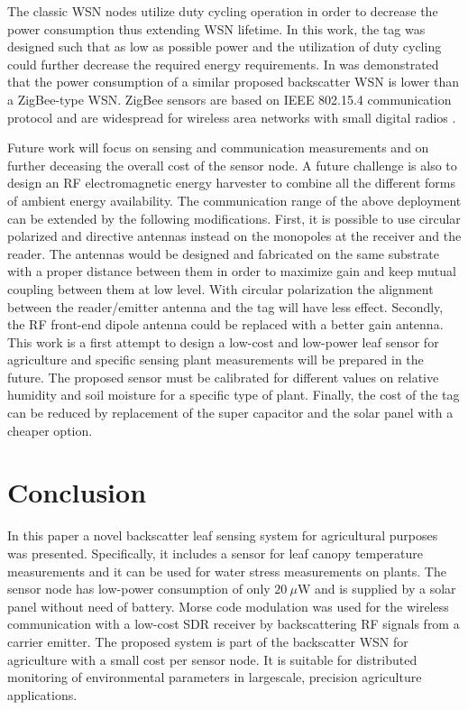 \documentclass[journal]{IEEEtran}
\begin{document}
%
The classic  WSN nodes utilize duty cycling operation in
order to decrease the power consumption thus extending WSN lifetime.
%
In this work, the  tag was designed such that as low as possible power and the utilization of duty cycling could further decrease the required energy requirements.
%
In \cite{kampianakis2014wireless} was demonstrated that the power consumption of a similar proposed backscatter WSN is lower than a ZigBee-type WSN. 
%
ZigBee sensors are based on IEEE 802.15.4 communication protocol and are widespread for  wireless area networks with small digital radios \cite{baronti2007wireless}.


Future work will focus on sensing and communication measurements and  
on  further deceasing the overall cost of the sensor node.
%
A future challenge is  also to  design an RF  electromagnetic energy  harvester  to combine all the different forms of ambient energy availability.
%
The communication range of  the above deployment can be extended  by the
following modifications.
%
First, it is possible to use circular polarized and directive antennas instead on the monopoles at the  receiver and the reader. 
%
%
The antennas  would be  designed and fabricated on the same substrate with    
a proper distance  between them in order to maximize gain  and keep mutual coupling between them at low level. 
%
With circular polarization the alignment between the reader/emitter antenna and the tag will have less effect.
%
Secondly, the RF front-end dipole antenna could be replaced with a better gain antenna. 
%
This work is a first attempt to design  a low-cost and low-power leaf sensor  for agriculture  and specific sensing plant measurements  will be prepared in the future. 
%
The proposed sensor must be calibrated for different values on relative humidity and soil moisture for a  specific type of plant. 
%
Finally, the cost of the tag can be reduced by replacement  of  the super capacitor  and the solar panel with  a cheaper option.
%
%
%
\section{Conclusion}
\label{sec:conclusion}
%
In this paper a novel  backscatter leaf sensing system for agricultural purposes was presented. 
%
Specifically, it includes a  sensor for leaf canopy temperature measurements and  it  can be used for  water stress measurements on plants.
%
The sensor node has low-power consumption of only $20~\mu$W and is supplied by a solar panel without need of battery.
%
Morse code modulation was used for the wireless communication
with a low-cost SDR receiver by backscattering RF signals from a carrier emitter.
%
The proposed system  is part of the  backscatter WSN for agriculture  with a small cost per sensor node.
%
It is suitable for distributed monitoring of environmental parameters in largescale, precision agriculture applications.
%
\end{document}

